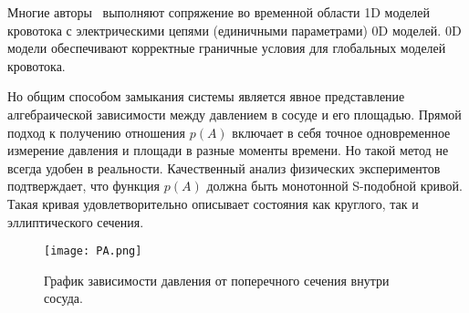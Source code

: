 Многие авторы~\cite{alastruey:2008} выполняют сопряжение во временной области 1D моделей кровотока с электрическими цепями
(единичными параметрами) 0D моделей. 0D модели обеспечивают корректные граничные условия для глобальных моделей кровотока.

Но общим способом замыкания системы является явное представление алгебраической зависимости
между давлением в сосуде и его площадью. Прямой подход к получению отношения $p(A)$ включает в себя точное одновременное измерение
давления и площади в разные моменты времени. Но такой метод не всегда удобен в реальности.
Качественный анализ физических экспериментов подтверждает, что функция $p(A)$ должна быть монотонной S-подобной кривой. 
Такая кривая удовлетворительно описывает состояния как круглого, так и эллиптического сечения. 


\begin{figure}[h]
    \centering
    \texttt{[image: PA.png]}
    \caption{График зависимости давления от поперечного сечения внутри сосуда.}
    \label{ych}
\end{figure}

